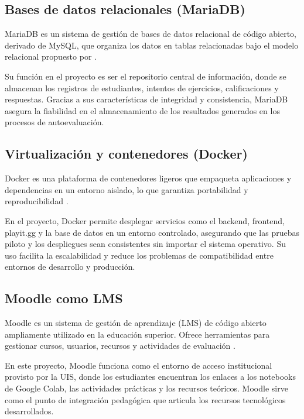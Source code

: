 \documentclass[letter,oneside,12pt,spanish]{report}
\begin{document}
\subsection{Bases de datos relacionales (MariaDB)}

MariaDB es un sistema de gestión de bases de datos relacional de código abierto, derivado de MySQL, que organiza los datos en tablas relacionadas bajo el modelo relacional propuesto por \textcite{codd1970}.

Su función en el proyecto es ser el repositorio central de información, donde se almacenan los registros de estudiantes, intentos de ejercicios, calificaciones y respuestas. Gracias a sus características de integridad y consistencia, MariaDB asegura la fiabilidad en el almacenamiento de los resultados generados en los procesos de autoevaluación.

\subsection{Virtualización y contenedores (Docker)}

Docker es una plataforma de contenedores ligeros que empaqueta aplicaciones y dependencias en un entorno aislado, lo que garantiza portabilidad y reproducibilidad \parencite{merkel2014}.

En el proyecto, Docker permite desplegar servicios como el backend, frontend, playit.gg y la base de datos en un entorno controlado, asegurando que las pruebas piloto y los despliegues sean consistentes sin importar el sistema operativo. Su uso facilita la escalabilidad y reduce los problemas de compatibilidad entre entornos de desarrollo y producción.

\subsection{Moodle como LMS}

Moodle es un sistema de gestión de aprendizaje (LMS) de código abierto ampliamente utilizado en la educación superior. Ofrece herramientas para gestionar cursos, usuarios, recursos y actividades de evaluación \parencite{dougiamas2003}.

En este proyecto, Moodle funciona como el entorno de acceso institucional provisto por la UIS, donde los estudiantes encuentran los enlaces a los notebooks de Google Colab, las actividades prácticas y los recursos teóricos. Moodle sirve como el punto de integración pedagógica que articula los recursos tecnológicos desarrollados.
\end{document}
